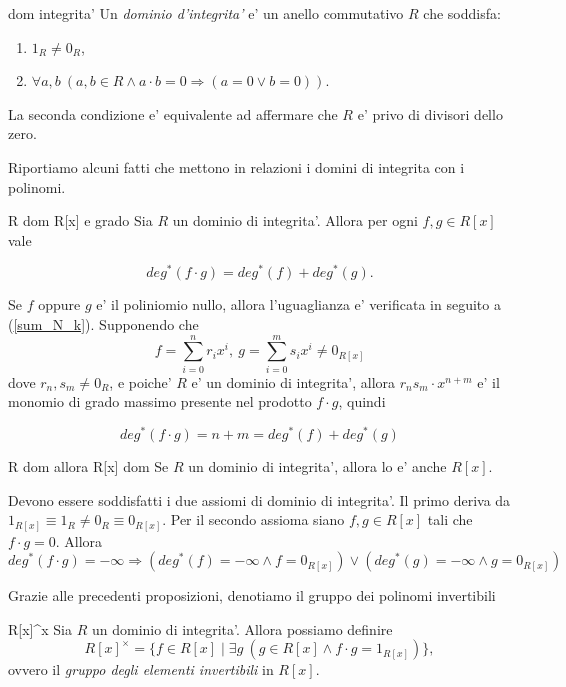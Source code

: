 \begin{defn}{dom integrita'}
Un \emph{dominio d'integrita'} e' un anello commutativo $R$ che soddisfa:
\begin{enumerate}
  \item $1_R \neq 0_R$,
  \item $\forall a,b\ (a, b \in R \land a\cdot b = 0 \Rightarrow (a=0 \lor b=0))$.
\end{enumerate}
La seconda condizione e' equivalente ad affermare che $R$ e' privo di divisori dello zero.
\end{defn}
Riportiamo alcuni fatti che mettono in relazioni i domini di integrita con i polinomi.

\begin{prop}[]{R dom R[x] e grado}
Sia $R$ un dominio di integrita'. Allora per ogni $f,g \in R[x]$ vale

\begin{equation}
deg^*(f\cdot g) = deg^*(f) + deg^*(g).
\end{equation}

\end{prop}
\begin{dimostrazione}
Se $f$ oppure $g$ e' il poliniomio nullo, allora l'uguaglianza e' verificata in seguito a (\ref{sum_N_k}). 
Supponendo che
\[f = \sum_{i=0}^{n}r_ix^i,\ g = \sum_{i=0}^{m}s_ix^i \neq 0_{R[x]}\]
dove $r_n,s_m \neq 0_R$, e poiche' $R$ e' un dominio di integrita', allora
$r_ns_m \cdot x^{n+m}$ e' il monomio di grado massimo presente nel prodotto $f\cdot g$, quindi

\[deg^*(f \cdot g) = n + m = deg^*(f) + deg^*(g)\]
\end{dimostrazione}

\begin{prop}[]{R dom allora R[x] dom}
Se $R$ un dominio di integrita', allora lo e' anche $R[x]$.
\end{prop}
\begin{dimostrazione}
Devono essere soddisfatti i due assiomi di dominio di integrita'.
Il primo deriva da $1_{R[x]} \equiv 1_R \neq 0_R \equiv 0_{R[x]}$.
Per il secondo assioma siano $f,g \in R[x]$ tali che $f\cdot g = 0$. Allora 
\[deg^*(f\cdot g) = -\infty \Longrightarrow (deg^*(f) = -\infty \land f=0_{R[x]}) \lor (deg^*(g) = -\infty \land g=0_{R[x]}) \]
\end{dimostrazione}
Grazie alle precedenti proposizioni, denotiamo il gruppo dei polinomi invertibili

\begin{defn}{R[x]^x}
Sia $R$ un dominio di integrita'. Allora possiamo definire
\[R[x]^{\times} = \{ f \in R[x] \mid \exists g\ (g\in R[x] \land f\cdot g = 1_{R[x]}) \} ,\]
ovvero il \emph{gruppo degli elementi invertibili} in $R[x]$.
\end{defn}

